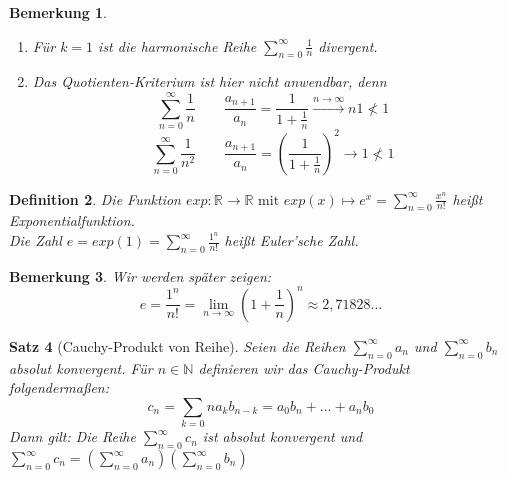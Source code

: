 \documentclass[a4paper,titlepage,oneside]{article}
\def\N{\ensuremath{\mathbb{N}} }
\def\R{\ensuremath{\mathbb{R}} }
\def\e{\ensuremath{\mathit{e}}}
\newcommand{\suminf}[2][n]{\ensuremath{\sum_{#1= 0}^{\infty}{#2}}}
\renewcommand{\liminf}[2][n]{\ensuremath{\lim\limits_{#1 \rightarrow \infty}{#2}}}
\newcommand{\longtoinf}[1][n]{\ensuremath{\overset{\scriptscriptstyle{#1 \to \infty}}{\longrightarrow}}}
\theoremstyle{thmstyle}
\newtheorem{satz}{Satz}[subsection]
\newtheorem{defi}[satz]{Definition}
\newtheorem{bem}[satz]{Bemerkung}
\begin{document}
\begin{bem}
\begin{enumerate}
\item Für \(k = 1\) ist die harmonische Reihe \suminf{\frac{1}{n}} divergent.
\item Das Quotienten-Kriterium ist hier nicht anwendbar, denn \\
\[\suminf{\frac{1}{n}} \qquad \frac{a_{n+1}}{a_n} = \frac{1}{1 + \frac{1}{n}} \longtoinf{n} 1 \not < 1\]
\[\suminf{\frac{1}{n^2}} \qquad \frac{a_{n+1}}{a_n} = \left(\frac{1}{1 + \frac{1}{n}}\right)^2 \longrightarrow 1 \not < 1\]
\end{enumerate}
\end{bem}

\begin{defi}
Die Funktion \(exp: \R \to \R \text{ mit } exp(x) \mapsto \e^x = \suminf{\frac{x^n}{n!}}\) heißt Exponentialfunktion.\\
Die Zahl \(\e = exp(1) = \suminf{\frac{1^n}{n!}} \) heißt Euler'sche Zahl.
\end{defi}

\begin{bem}
Wir werden später zeigen:
\[\e = \frac{1^n}{n!} = \liminf{\left(1 + \frac{1}{n}\right)^n} \approx 2,71828...\]
\end{bem}

\begin{satz}[Cauchy-Produkt von Reihe]
Seien die Reihen \suminf{a_n} und \suminf{b_n} absolut konvergent. Für $n \in \N$ definieren wir das Cauchy-Produkt folgendermaßen:
\[c_n = \sum_{k = 0}{n}{a_kb_{n-k}} = a_0b_n + \dots + a_nb_0\]
Dann gilt: Die Reihe \suminf{c_n} ist absolut konvergent und $\suminf{c_n} = \left( \suminf{a_n} \right)  \left( \suminf{b_n} \right) $
\proof[Beweisidee] 
\begin{center}
\end{center}
\end{satz}
\end{document}

